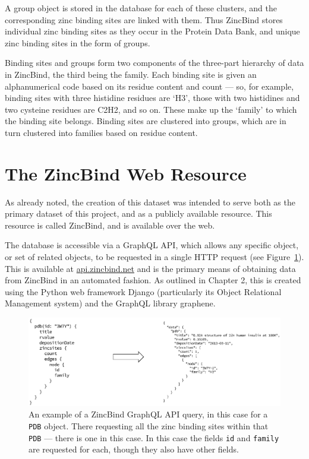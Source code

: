 A group object is stored in the database for each of these clusters, and the corresponding zinc binding sites are linked with them. Thus ZincBind stores individual zinc binding sites as they occur in the Protein Data Bank, and unique zinc binding sites in the form of groups.

Binding sites and groups form two components of the three-part hierarchy of data in ZincBind, the third being the family. Each binding site is given an alphanumerical code based on its residue content and count --- so, for example, binding sites with three histidine residues are `H3', those with two histidines and two cysteine residues are C2H2, and so on. These make up the `family' to which the binding site belongs. Binding sites are clustered into groups, which are in turn clustered into families based on residue content.

\section{The ZincBind Web Resource}

As already noted, the creation of this dataset was intended to serve both as the primary dataset of this project, and as a publicly available resource. This resource is called ZincBind, and is available over the web.

The database is accessible via a GraphQL API, which allows any specific object, or set of related objects, to be requested in a single HTTP request (see Figure~\ref{fig:zincbind-api-example}). This is available at \url{api.zincbind.net} and is the primary means of obtaining data from ZincBind in an automated fashion. As outlined in Chapter 2, this is created using the Python web framework Django (particularly its Object Relational Management system) and the GraphQL library graphene.

\begin{figure}
\centering
\includegraphics[width=1.0\textwidth]{Figures/zincbind-api-example.eps}
\caption[An example of a ZincBind GraphQL API query.]{\label{fig:zincbind-api-example} An example of a ZincBind GraphQL API query, in this case for a \texttt{PDB} object.
There requesting all the zinc binding sites within that \texttt{PDB} --- there is
one in this case. In this case the fields \texttt{id} and \texttt{family} are
requested for each, though they also have other fields.}
\end{figure}

